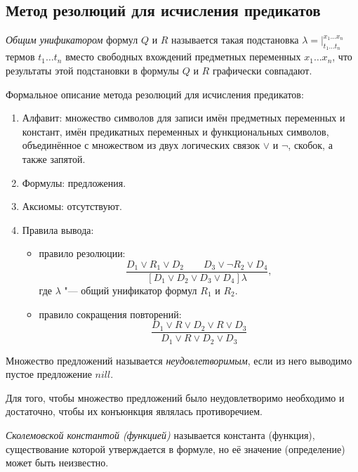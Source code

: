 \subsection*{Метод резолюций для исчисления предикатов}

\begin{definition}
	\emph{Общим унификатором} формул $ Q $ и $ R $ называется такая подстановка $ \lambda = \big|_{t_1 \dots t_n}^{x_1 \dots x_n} $ термов $ t_1 \dots t_n $ вместо свободных вхождений предметных переменных $ x_1 \dots x_n $, что результаты этой подстановки в формулы $ Q $ и $ R $ графически совпадают.
\end{definition}

Формальное описание метода резолюций для исчисления предикатов:
\begin{enumerate}
	\item Алфавит: множество символов для записи имён предметных переменных и констант, имён предикатных переменных и функциональных символов, объединённое с множеством из двух логических связок $ \vee $ и $ \neg $, скобок, а также запятой.
	\item Формулы: предложения.
	\item Аксиомы: отсутствуют.
	\item Правила вывода:
		\begin{itemize}
			\item правило резолюции:
				$$ \frac{D_1 \vee R_1 \vee D_2 \qquad D_3 \vee \neg R_2 \vee D_4}{[D_1 \vee D_2 \vee D_3 \vee D_4]\lambda}, $$
				где $ \lambda $ "--- общий унификатор формул $ R_1 $ и $ R_2 $.
			\item правило сокращения повторений:
				$$ \frac{D_1 \vee R \vee D_2 \vee R \vee D_3}{D_1 \vee R \vee D_2 \vee D_3} $$
		\end{itemize}
\end{enumerate}

\begin{definition}
	Множество предложений называется \emph{неудовлетворимым}, если из него выводимо пустое предложение $ nill $.
\end{definition}

\begin{theorem}
	Для того, чтобы множество предложений было неудовлетворимо необходимо и достаточно, чтобы их конъюнкция являлась противоречием.
\end{theorem}

\begin{definition}
	\emph{Сколемовской константой (функцией)} называется константа (функция), существование которой утверждается в формуле, но её значение (определение) может быть неизвестно.
\end{definition}
